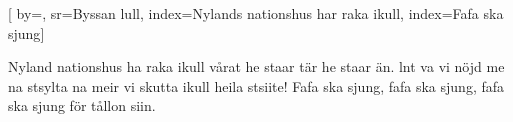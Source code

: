

[ 		%
	by={},					%
	sr={Byssan lull},					%
	index={Nylands nationshus har raka ikull}, %
	index={Fafa ska sjung}]						%
	

\beginverse*						%
Nyland nationshus ha raka ikull
vårat he staar tär he staar än.
lnt va vi nöjd me na stsylta na meir
vi skutta ikull heila stsiite!
Fafa ska sjung, 
fafa ska sjung,
fafa ska sjung för tållon siin.
\endverse							%

\endsong							%